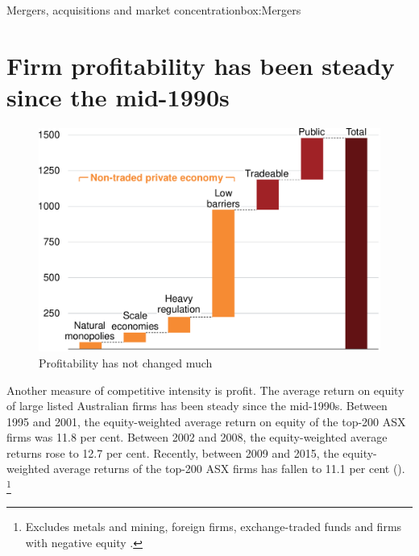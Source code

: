 \begin{bigbox}{Mergers, acquisitions and market concentration}{box:Mergers}
\end{bigbox}



\section{Firm profitability has been steady since the mid-1990s}

\begin{figure}
    \caption{Profitability has not changed much \label{fig:ASXROEspreads}}
  \includegraphics[page=15]{atlas/Charts} 
\end{figure}

Another measure of competitive intensity is profit. The average return on equity of large listed Australian firms has been steady since the mid-1990s. Between 1995 and 2001, the equity-weighted average return on equity of the top-200 ASX firms was 11.8 per cent. Between 2002 and 2008, the equity-weighted average returns rose to 12.7 per cent. Recently, between 2009 and 2015, the equity-weighted average returns of the top-200 ASX firms has fallen to 11.1 per cent ().%
    \footnote{Excludes metals and mining, foreign firms, exchange-traded funds and firms with negative equity \parencite{Morningstar2017}.}

